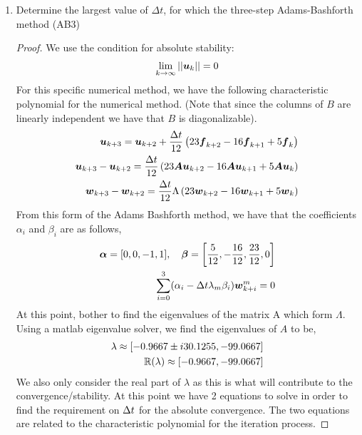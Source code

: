 \documentclass{article}
\begin{document}
\begin{enumerate}[label=\alph*)]

  \item Determine the largest value of $\Delta t$, for which the three-step 
        Adams-Bashforth method (AB3)
    \begin{proof}
      We use the condition for absolute stability: 
      \begin{align}
        \lim_{k \to \infty} ||\boldsymbol{u}_k|| = 0
      \end{align}
      For this specific numerical method, we have the following characteristic
      polynomial for the numerical method. (Note that since the columns of $B$
      are linearly independent we have that $B$ is diagonalizable).
      \begin{align}
        \boldsymbol{u}_{k+3} = \boldsymbol{u}_{k+2} + \frac{\Delta t}{12}\left(23\boldsymbol{f}_{k+2} -
        16\boldsymbol{f}_{k+1} + 5\boldsymbol{f}_k\right)\\
        \boldsymbol{u}_{k+3} - \boldsymbol{u}_{k+2} = \frac{\Delta t}{12}\left( 23\boldsymbol{Au}_{k+2} -
        16\boldsymbol{Au}_{k+1} + 5\boldsymbol{Au}_k\right)\\
        \boldsymbol{w}_{k+3} - \boldsymbol{w}_{k+2} = \frac{\Delta t}{12}\Lambda\left( 23\boldsymbol{w}_{k+2} -
        16\boldsymbol{w}_{k+1} + 5\boldsymbol{w}_k\right)
      \end{align}
      From this form of the Adams Bashforth method, we have that the
      coefficients $\alpha_i$ and $\beta_i$ are as follows, 
      \begin{align}
        \boldsymbol{\alpha} = [0, 0, -1, 1], \quad \boldsymbol{\beta} = \left[ \frac{5}{12},
        -\frac{16}{12}, \frac{23}{12}, 0\right]  \\
        \sum_{i=0}^3 (\alpha_i - \Delta t\lambda_m\beta_i)\boldsymbol{w}_{k+i}^m = 0
      \end{align}
      At this point, bother to find the eigenvalues of the matrix A which form
      $\Lambda$. Using a matlab eigenvalue solver, we find the eigenvalues of
      $A$ to be, 
      \begin{align}
            \lambda \approx \left[ -0.9667 \pm i 30.1255, -99.0667\right]\\
            \mathbb{R}(\lambda) \approx \left[ -0.9667, -99.0667\right]
      \end{align}
      We also only consider the real part of $\lambda$ as this is what will
      contribute to the convergence/stability. At this point we have 2 equations
      to solve in order to find the requirement on $\Delta t$ for the absolute
      convergence. The two equations are related to the characteristic
      polynomial for the iteration process. 

\end{proof}
\end{enumerate}
\end{document}
